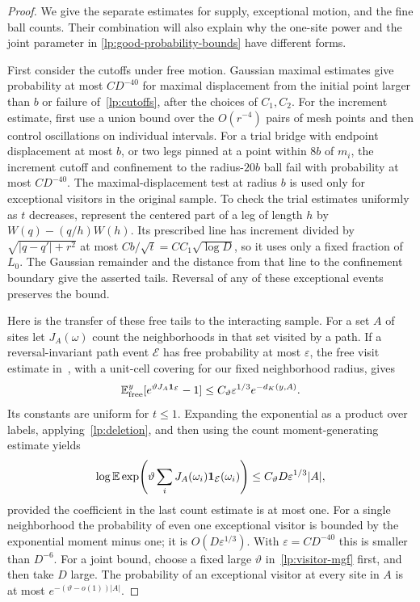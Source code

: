 \begin{proof}
We give the separate estimates for supply, exceptional motion, and
the fine ball counts.  Their combination will also explain why the
one-site power and the joint parameter in
\eqref{lp:good-probability-bounds} have different forms.

First consider the cutoffs under free motion.  Gaussian maximal
estimates give probability at most $CD^{-40}$ for maximal displacement
from the initial point larger than $b$ or failure of~\eqref{lp:cutoffs},
after the choices of
$C_1,C_2$.  For the increment estimate, first use a union bound over
the $O(r^{-4})$ pairs of mesh points and then control oscillations on
individual intervals.  For a trial bridge with endpoint displacement
at most $b$, or two legs pinned at a point within $8b$ of $m_i$, the
increment cutoff and confinement to the radius-$20b$ ball fail with
probability at most $CD^{-40}$.  The maximal-displacement test at
radius $b$ is used only for exceptional visitors in the original
sample.  To check the trial estimates uniformly as $t$ decreases,
represent the centered
part of a leg of length $h$ by $W(q)-(q/h)W(h)$.  Its prescribed line
has increment divided by $\sqrt{|q-q'|+r^2}$ at most
$C b/\sqrt t=C C_1\sqrt{\log D}$, so it uses only a fixed fraction
of $L_0$.  The Gaussian remainder and the distance from that line to
the confinement boundary give the asserted tails.  Reversal of any
of these exceptional events preserves the bound.

Here is the transfer of these free tails to the interacting sample.
For a set $A$ of sites let $J_A(\omega)$ count the neighborhoods in
that set visited by a path.  If a reversal-invariant path event
$\mathcal E$ has free probability at most $\varepsilon$, the free
visit estimate in~\cite[Lemma~4.5]{H}, with a
unit-cell covering for our fixed neighborhood radius, gives
\[
 \mathbb E_{\mathrm{free}}^y
       [e^{\vartheta J_A\mathbf 1_{\mathcal E}}-1]
 \leq C_\vartheta\varepsilon^{1/3}e^{-d_K(y,A)}.
\]
Its constants are uniform for $t\leq1$.  Expanding the exponential
as a product over labels, applying~\eqref{lp:deletion}, and then
using the count moment-generating estimate yields
\begin{equation}\label{lp:visitor-mgf}
 \log\mathbb E\exp\!\left(\vartheta\sum_i
             J_A(\omega_i)\mathbf 1_{\mathcal E}(\omega_i)\right)
 \leq C_\vartheta D\varepsilon^{1/3}|A|,
\end{equation}
provided the coefficient in the last count estimate is at most one.
For a single neighborhood the probability of even one exceptional
visitor is bounded by the exponential moment minus one; it is
$O(D\varepsilon^{1/3})$.  With $\varepsilon=CD^{-40}$ this is
smaller than $D^{-6}$.  For a joint bound, choose a fixed large
$\vartheta$ in~\eqref{lp:visitor-mgf} first, and then take $D$ large.
The probability of an exceptional visitor at every site in $A$ is
at most $e^{-(\vartheta-o(1))|A|}$.


\end{proof}
